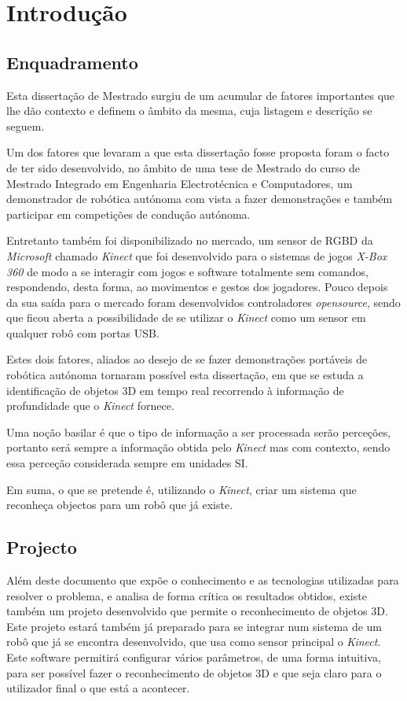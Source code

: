 \chapter{Introdução} \label{chap:intro}

\section{Enquadramento} \label{sec:context}

Esta dissertação de Mestrado surgiu de um acumular de fatores importantes que lhe dão contexto e definem o âmbito da mesma, cuja listagem e descrição se seguem.

Um dos fatores que levaram a que esta dissertação fosse proposta foram o facto de ter sido desenvolvido, no âmbito de uma tese de Mestrado do curso de Mestrado Integrado em Engenharia Electrotécnica e Computadores, um demonstrador de robótica autónoma com vista a fazer demonstrações e também participar em competições de condução autónoma. 

Entretanto também foi disponibilizado no mercado, um sensor de RGBD da \emph{Microsoft} chamado \emph{Kinect} que foi desenvolvido para o sistemas de jogos \emph{X-Box 360} de modo a se interagir com jogos e software totalmente sem comandos, respondendo, desta forma, ao movimentos e gestos dos jogadores. Pouco depois da sua saída para o mercado foram desenvolvidos controladores \emph{opensource}, sendo que ficou aberta a possibilidade de se utilizar o \emph{Kinect} como um sensor em qualquer robô com portas USB.

Estes dois fatores, aliados ao desejo de se fazer demonstrações portáveis de robótica autónoma tornaram possível esta dissertação, em que se estuda a identificação de objetos 3D em tempo real recorrendo à informação de profundidade que o \emph{Kinect} fornece.

Uma noção basilar é que o tipo de informação a ser processada serão perceções, portanto será sempre a informação obtida pelo \emph{Kinect} mas com contexto, sendo essa perceção considerada sempre em unidades SI.

Em suma, o que se pretende é, utilizando o \emph{Kinect}, criar um sistema que reconheça objectos para um robô que já existe.

\section{Projecto} \label{sec:proj}

Além deste documento que expõe o conhecimento e as tecnologias utilizadas para resolver o problema, e analisa de forma crítica os resultados obtidos, existe também um projeto desenvolvido que permite o reconhecimento de objetos 3D. Este projeto estará também já preparado para se integrar num sistema de um robô que já se encontra desenvolvido, que usa como sensor principal o \emph{Kinect}. Este software permitirá configurar vários parâmetros, de uma forma intuitiva, para ser possível fazer o reconhecimento de objetos 3D e que seja claro para o utilizador final o que está a acontecer.

